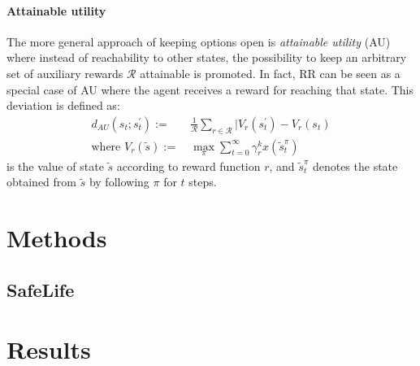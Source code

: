 \documentclass[12pt,A4]{report}
\theoremstyle{definition}
\begin{document}
\subsubsection{Attainable utility}
The more general approach of keeping options open is \textit{attainable utility} (AU) where instead of reachability to other states, the possibility to keep an arbitrary set of auxiliary rewards $\mathcal{R}$ attainable is promoted. In fact, RR can be seen as a special case of AU where the agent receives a reward for reaching that state. This deviation is defined as:
\begin{align*}
  d_{AU}(s_t;s_t^\prime) := & \ \frac{1}{\mathcal{R}} \sum_{r\in\mathcal{R}} |V_r(s_t^\prime) - V_r(s_t) \\
  \text{where } V_r(\tilde{s}) := & \ \max_\pi \sum_{t=0}^\infty \gamma_r^k x(\tilde{s}_t^\pi)
\end{align*}
is the value of state $\tilde{s}$ according to reward function $r$, and $\tilde{s}_t^\pi$ denotes the state obtained from $\tilde{s}$ by following $\pi$ for $t$ steps.





\chapter{Methods}

\section{SafeLife}





\chapter{Results}
\end{document}
